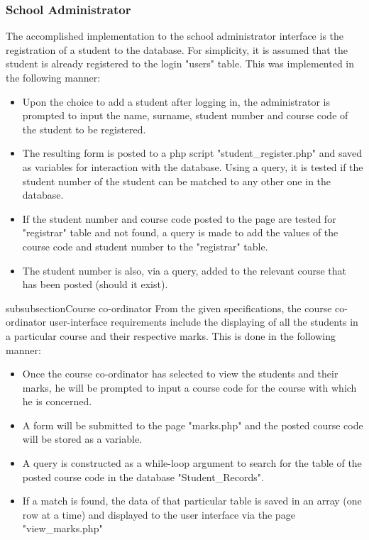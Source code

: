 \subsubsection{School Administrator}
The accomplished implementation to the school administrator interface is the registration of a student to the database. For simplicity, it is assumed that the student is already registered to the login "users" table. This was implemented in the following manner:

\begin{itemize}
	\item Upon the choice to add a student after logging in, the administrator is prompted to input the name, surname, student number and course code of the student to be registered.
	\item The resulting form is posted to a php script "student\_register.php" and saved as variables for interaction with the database. Using a query, it is tested if the student number of the student can be matched to any other one in the database.  
	\item If the student number and course code posted to the page are tested for "registrar" table and not found, a query is made to add the values of the course code and student number to the "registrar" table.
	\item The student number is also, via a query, added to the relevant course that has been posted (should it exist).
\end{itemize}

subsubsection{Course co-ordinator}
From the given specifications, the course co-ordinator user-interface requirements include the displaying of all the students in a particular course and their respective marks. This is done in the following manner:

\begin{itemize}
	\item Once the course co-ordinator has selected to view the students and their marks, he will be prompted to input a course code for the course with which he is concerned.
	\item A form will be submitted to the page "marks.php" and the posted course code will be stored as a variable.
	\item A query is constructed as a while-loop argument to search for the table of the posted course code in the database "Student\_Records".
	\item If a match is found, the data of that particular table is saved in an array (one row at a time) and displayed to the user interface via the page "view\_marks.php"
\end{itemize}





